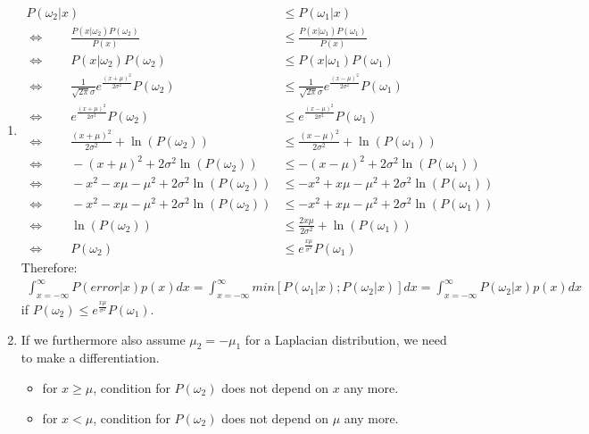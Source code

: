 \documentclass[paper=a4,fontsize=10pt,DIV11,BCOR10mm]{scrartcl}
\begin{document}
\begin{enumerate}[label={(\alph*)}]
\item
	\begin{align*}
	P(\omega_2|x) &\leq P(\omega_1|x)\\
	\Leftrightarrow \qquad \frac{P(x|\omega_2)P(\omega_2)}{P(x)} &\leq \frac{P(x|\omega_1)P(\omega_1)}{P(x)}\\
	\Leftrightarrow \qquad P(x|\omega_2)P(\omega_2)&\leq P(x|\omega_1)P(\omega_1)\\
	\Leftrightarrow \qquad \frac{1}{\sqrt{2\pi}\sigma}e^{ \displaystyle\frac{(x+\mu)^2}{2\sigma^2}}P(\omega_2) &\leq \frac{1}{\sqrt{2\pi}\sigma}e^{\displaystyle \frac{(x-\mu)^2}{2\sigma^2}}P(\omega_1)\\
	\Leftrightarrow \qquad e^{\displaystyle\frac{(x+\mu)^2}{2\sigma^2}}P(\omega_2) &\leq e^{\displaystyle \frac{(x-\mu)^2}{2\sigma^2}}P(\omega_1)\\
	\Leftrightarrow \qquad \frac{(x+\mu)^2}{2\sigma^2} + \ln(P(\omega_2)) &\leq \frac{(x-\mu)^2}{2\sigma^2} + \ln(P(\omega_1))\\
	\Leftrightarrow \qquad -(x+\mu)^2 + 2\sigma^2\ln(P(\omega_2)) &\leq -(x-\mu)^2 + 2\sigma^2\ln(P(\omega_1))\\
	\Leftrightarrow \qquad -x^2 -x\mu -\mu^2 + 2\sigma^2\ln(P(\omega_2)) &\leq -x^2+x\mu -\mu^2 + 2\sigma^2\ln(P(\omega_1))\\
	\Leftrightarrow \qquad -x^2 -x\mu -\mu^2 + 2\sigma^2\ln(P(\omega_2)) &\leq -x^2+x\mu -\mu^2 + 2\sigma^2\ln(P(\omega_1))\\
	\Leftrightarrow \qquad \ln(P(\omega_2)) &\leq \frac{2x\mu}{2\sigma^2}+\ln(P(\omega_1))\\
	\Leftrightarrow \qquad P(\omega_2) &\leq e^{\displaystyle \frac{x\mu}{\sigma^2}}P(\omega_1)
	\end{align*}
	Therefore:\\
	\begin{align*}
		\int_{x=-\infty}^\infty P(error|x)p(x)dx=\int_{x=-\infty}^\infty min[P(\omega_1|x); P(\omega_2|x)]dx=\int_{x=-\infty}^\infty P(\omega_2|x)p(x)dx
	\end{align*}
	if $P(\omega_2) \leq e^{\frac{x\mu}{\sigma^2}}P(\omega_1)$.
	\item If we furthermore also assume $\mu_2 = -\mu_1$ for a Laplacian distribution, we need to make a differentiation.
	\begin{itemize}
		\item for $x\geq \mu$, condition for $P(\omega_2)$ does not depend on $x$ any more.
		\item for $x < \mu$, condition for $P(\omega_2)$ does not depend on $\mu$ any more.
	\end{itemize}
\end{enumerate}
\end{document}
